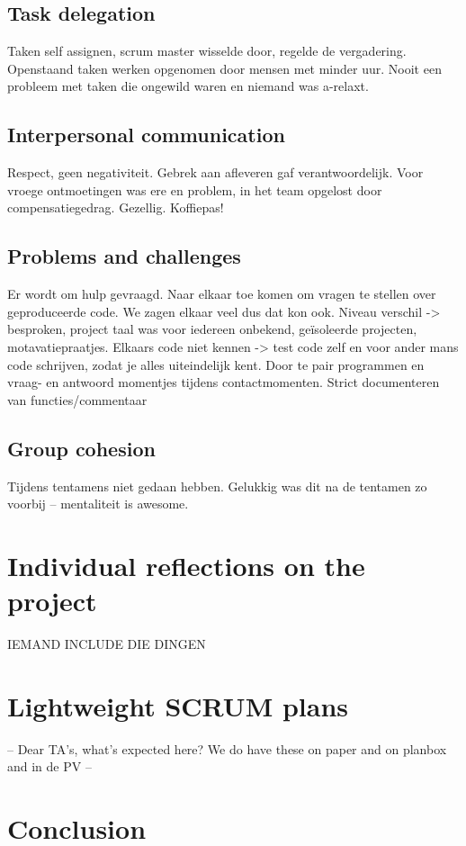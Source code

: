 \documentclass[10pt,a4paper]{report}
\begin{document}
		\subsection{Task delegation}
Taken self assignen, scrum master wisselde door, regelde de vergadering. Openstaand taken werken opgenomen door mensen met minder uur. Nooit een probleem met taken die ongewild waren en niemand was a-relaxt. 

		\subsection{Interpersonal communication}
Respect, geen negativiteit. Gebrek aan afleveren gaf verantwoordelijk. Voor vroege ontmoetingen was ere en problem, in het team opgelost door compensatiegedrag. Gezellig. Koffiepas! 

		\subsection{Problems and challenges}
Er wordt om hulp gevraagd. Naar elkaar toe komen om vragen te stellen over geproduceerde code. We zagen elkaar veel dus dat kon ook.
	Niveau verschil -> besproken, project taal was voor iedereen onbekend, geïsoleerde projecten, motavatiepraatjes.
Elkaars code niet kennen -> test code zelf en voor ander mans code schrijven, zodat je alles uiteindelijk kent. Door te pair programmen en vraag- en antwoord momentjes tijdens contactmomenten. Strict documenteren van functies/commentaar

		\subsection{Group cohesion}
Tijdens tentamens niet gedaan hebben. Gelukkig was dit na de tentamen zo voorbij – mentaliteit is awesome.

	\section{Individual reflections on the project}
		IEMAND INCLUDE DIE DINGEN
		
	\section{Lightweight SCRUM plans}
		-- Dear TA's, what's expected here? We do have these on paper and on planbox and in de PV --
	
		
	\section{Conclusion}
	
\end{document}
